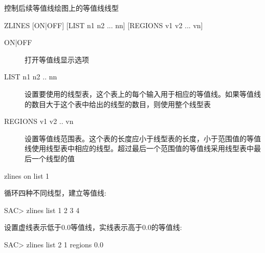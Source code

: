 \label{cmd:zlines}

控制后续等值线绘图上的等值线线型

\begin{SACSTX}
ZLINES  [ON|OFF] [LIST n1 n2 ... nn] [REGIONS v1 v2 ... vn]
\end{SACSTX}

\begin{description}
\item [ON|OFF] 打开等值线显示选项
\item [LIST n1 n2 .. nn] 设置要使用的线型表，这个表上的每个输入用于相应的等值线。如果等值线的数目大于这个表中给出的线型的数目，则使用整个线型表
\item [REGIONS v1 v2 .. vn] 设置等值线范围表。这个表的长度应小于线型表的长度，小于范围值的等值线使用线型表中相应的线型。超过最后一个范围值的等值线采用线型表中最后一个线型的值
\end{description}

\begin{SACDFT}
zlines on list 1
\end{SACDFT}

循环四种不同线型，建立等值线:
\begin{SACCode}
SAC> zlines list 1 2 3 4
\end{SACCode}

设置虚线表示低于0.0等值线，实线表示高于0.0的等值线:
\begin{SACCode}
SAC> zlines list 2 1 regions 0.0
\end{SACCode}
